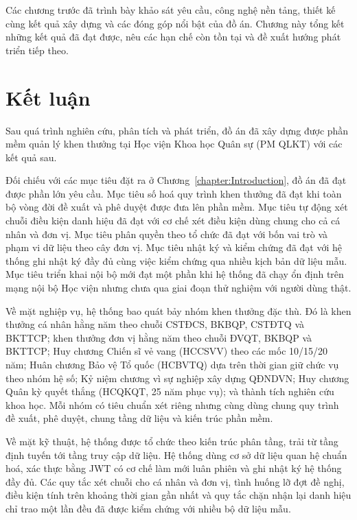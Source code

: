 \documentclass[../DoAn.tex]{subfiles}
\begin{document}
Các chương trước đã trình bày khảo sát yêu cầu, công nghệ nền tảng, thiết kế cùng kết quả xây dựng và các đóng góp nổi bật của đồ án. Chương này tổng kết những kết quả đã đạt được, nêu các hạn chế còn tồn tại và đề xuất hướng phát triển tiếp theo.

\section{Kết luận}
\label{section:6.1}

Sau quá trình nghiên cứu, phân tích và phát triển, đồ án đã xây dựng được phần mềm quản lý khen thưởng tại Học viện Khoa học Quân sự (PM QLKT) với các kết quả sau.

Đối chiếu với các mục tiêu đặt ra ở Chương~\ref{chapter:Introduction}, đồ án đã đạt được phần lớn yêu cầu. Mục tiêu số hoá quy trình khen thưởng đã đạt khi toàn bộ vòng đời đề xuất và phê duyệt được đưa lên phần mềm. Mục tiêu tự động xét chuỗi điều kiện danh hiệu đã đạt với cơ chế xét điều kiện dùng chung cho cả cá nhân và đơn vị. Mục tiêu phân quyền theo tổ chức đã đạt với bốn vai trò và phạm vi dữ liệu theo cây đơn vị. Mục tiêu nhật ký và kiểm chứng đã đạt với hệ thống ghi nhật ký đầy đủ cùng việc kiểm chứng qua nhiều kịch bản dữ liệu mẫu. Mục tiêu triển khai nội bộ mới đạt một phần khi hệ thống đã chạy ổn định trên mạng nội bộ Học viện nhưng chưa qua giai đoạn thử nghiệm với người dùng thật.

Về mặt nghiệp vụ, hệ thống bao quát bảy nhóm khen thưởng đặc thù.
Đó là khen thưởng cá nhân hằng năm theo chuỗi CSTĐCS, BKBQP, CSTĐTQ và BKTTCP; khen thưởng đơn vị hằng năm theo chuỗi ĐVQT, BKBQP và BKTTCP; Huy chương Chiến sĩ vẻ vang (HCCSVV) theo các mốc 10/15/20 năm; Huân chương Bảo vệ Tổ quốc (HCBVTQ) dựa trên thời gian giữ chức vụ theo nhóm hệ số; Kỷ niệm chương vì sự nghiệp xây dựng QĐNDVN; Huy chương Quân kỳ quyết thắng (HCQKQT, 25 năm phục vụ); và thành tích nghiên cứu khoa học.
Mỗi nhóm có tiêu chuẩn xét riêng nhưng cùng dùng chung quy trình đề xuất, phê duyệt, chung tầng dữ liệu và kiến trúc phần mềm.

Về mặt kỹ thuật, hệ thống được tổ chức theo kiến trúc phân tầng, trải từ tầng định tuyến tới tầng truy cập dữ liệu.
Hệ thống dùng cơ sở dữ liệu quan hệ chuẩn hoá, xác thực bằng JWT có cơ chế làm mới luân phiên và ghi nhật ký hệ thống đầy đủ.
Các quy tắc xét chuỗi cho cá nhân và đơn vị, tình huống lỡ đợt đề nghị, điều kiện tính trên khoảng thời gian gần nhất và quy tắc chặn nhận lại danh hiệu chỉ trao một lần đều đã được kiểm chứng với nhiều bộ dữ liệu mẫu.
\end{document}

